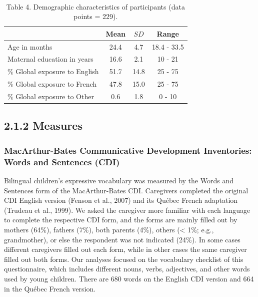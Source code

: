 \documentclass[
  english,
  ,man,floatsintext]{apa6}
\begin{document}
~

\begin{table}[h]

\begin{center}
\begin{threeparttable}

\caption{\label{tab:table4}Table 4. Demographic characteristics of participants (data points = 229).}

\begin{tabular}{lccc}
\toprule
 & Mean & $SD$ & Range\\
\midrule
Age in months & 24.4 & 4.7 & 18.4 - 33.5\\
Maternal education in years & 16.6 & 2.1 & 10 - 21\\
\% Global exposure to English & 51.7 & 14.8 & 25 - 75\\
\% Global exposure to French & 47.8 & 15.0 & 25 - 75\\
\% Global exposure to Other & 0.6 & 1.8 & 0 - 10\\
\bottomrule
\end{tabular}

\end{threeparttable}
\end{center}

\end{table}

\hypertarget{measures}{%
\subsection{2.1.2 Measures}\label{measures}}

\hypertarget{macarthur-bates-communicative-development-inventories-words-and-sentences-cdi}{%
\subsubsection{MacArthur-Bates Communicative Development Inventories: Words and Sentences (CDI)}\label{macarthur-bates-communicative-development-inventories-words-and-sentences-cdi}}

Bilingual children's expressive vocabulary was measured by the Words and Sentences form of the MacArthur-Bates CDI. Caregivers completed the original CDI English version (Fenson et al., 2007) and its Québec French adaptation (Trudeau et al., 1999). We asked the caregiver more familiar with each language to complete the respective CDI form, and the forms are mainly filled out by mothers (64\%), fathers (7\%), both parents (4\%), others (\textless{} 1\%; e.g., grandmother), or else the respondent was not indicated (24\%). In some cases different caregivers filled out each form, while in other cases the same caregiver filled out both forms. Our analyses focused on the vocabulary checklist of this questionnaire, which includes different nouns, verbs, adjectives, and other words used by young children. There are 680 words on the English CDI version and 664 in the Québec French version.
\end{document}
